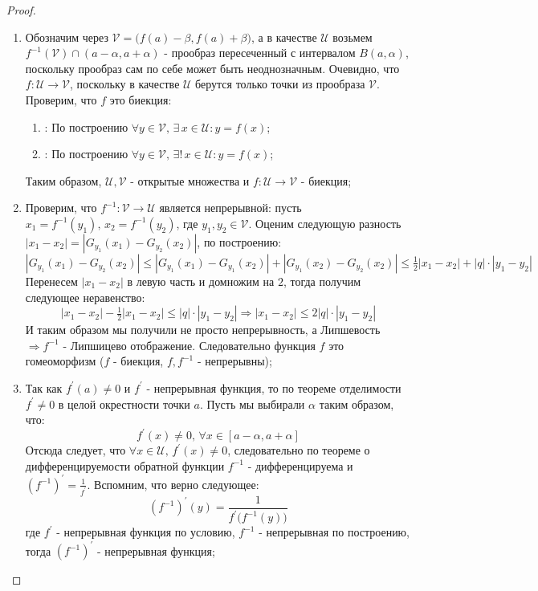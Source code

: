 \documentclass[12pt]{article}
\newcommand{\MU}{\mathcal{U}}
\newcommand{\MV}{\mathcal{V}}
\theoremstyle{definition}
\newtheorem{rem}{Rm:}
\begin{document}
\begin{proof}
\begin{enumerate}[label ={(\arabic*)}]
\begin{figure}[H]
			\caption{Существование единственного $x$ для каждого $y \in B\big(f(a),\beta\big)$.}
			\label{15_2}
		\end{figure}
		\begin{rem}
			Поскольку $G_y \colon [a-\alpha, a + \alpha] \to (a-\alpha, a + \alpha)$, то неподвижная точка $x = G_y(x)$ может находится только внутри интервала (области значений $G_y$).
		\end{rem}
		\item Обозначим через $\MV = \big(f(a)	- \beta, f(a) + \beta \big)$, а в качестве $\MU$ возьмем $f^{-1}(\MV)\cap (a - \alpha, a + \alpha)$ - прообраз пересеченный с интервалом $B(a,\alpha)$, поскольку прообраз сам по себе может быть неоднозначным. Очевидно, что $f \colon \MU \to \MV$, поскольку в качестве $\MU$ берутся только точки из прообраза $\MV$. Проверим, что $f$ это биекция:
		\begin{enumerate}[label ={\arabic*)}]
			\item \textbf{}: По построению $\forall y \in \MV, \, \exists \, x \in \MU \colon y = f(x)$;
			\item \textbf{}: По построению $\forall y \in \MV, \, \exists! \, x \in \MU \colon y = f(x)$;
		\end{enumerate}
		Таким образом, $\MU,\MV$ - открытые множества и $f \colon \MU \to \MV$ - биекция;
		\item Проверим, что $f^{-1} \colon \MV \to \MU$ является непрерывной: пусть $x_1 = f^{-1}(y_1),\, x_2 = f^{-1}(y_2)$, где $y_1, y_2 \in \MV$. Оценим следующую разность $|x_1 - x_2| = |G_{y_1}(x_1) - G_{y_2}(x_2)|$, по построению:
		$$
			|G_{y_1}(x_1) - G_{y_2}(x_2)| \leq |G_{y_1}(x_1) - G_{y_1}(x_2)| + |G_{y_1}(x_2) - G_{y_2}(x_2)| \leq \tfrac{1}{2}|x_1 - x_2| + |q|{\cdot}|y_1 - y_2|
		$$
		Перенесем $|x_1 - x_2|$ в левую часть и домножим на $2$, тогда получим следующее неравенство: 
		$$
			|x_1 - x_2| - \tfrac{1}{2}|x_1 - x_2| \leq |q|{\cdot}|y_1 - y_2| \Rightarrow |x_1 - x_2| \leq 2|q|{\cdot}|y_1 - y_2|
		$$ 
		И таким образом мы получили не просто непрерывность, а Липшевость $\Rightarrow f^{-1}$ - Липшицево отображение. Следовательно функция $f$ это гомеоморфизм ($f$ - биекция, $f,f^{-1}$ - непрерывны);
		
		\item Так как $f^\prime(a) \neq 0$ и $f^\prime$ - непрерывная функция, то по теореме отделимости $f^\prime \neq 0$ в целой окрестности точки $a$. Пусть мы выбирали $\alpha$ таким образом, что:
		$$
			f^\prime(x) \neq 0, \, \forall x \in [a - \alpha, a + \alpha]
		$$ 
		Отсюда следует, что $\forall x \in \MU, \, f^\prime(x) \neq 0$, следовательно по теореме о дифференцируемости обратной функции $f^{-1}$ - дифференцируема и $(f^{-1})^\prime = \tfrac{1}{f^\prime}$. Вспомним, что верно следующее:
		$$
			(f^{-1})^\prime(y) = \dfrac{1}{f^\prime\big(f^{-1}(y)\big)}
		$$
		где $f^\prime$ - непрерывная функция по условию, $f^{-1}$ - непрерывная по построению, тогда $(f^{-1})^\prime$ - непрерывная функция;
	\end{enumerate}
\end{proof}
\end{document}

